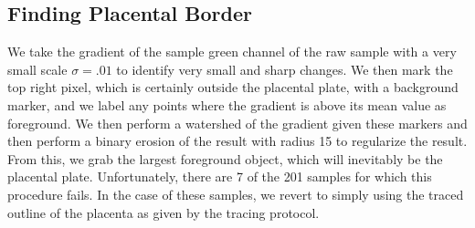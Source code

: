 %    
    
    \subsection{Finding Placental Border}
		
		We take the gradient of the sample green channel of the raw sample with a very small scale $\sigma=.01$ to identify very small and sharp changes. We then mark the top right pixel, which is certainly outside the placental plate, with a background marker, and we label any points where the gradient is above its mean value as foreground. We then perform a watershed of the gradient given these markers and then perform a binary erosion of the result with radius 15 to regularize the result. From this, we grab the largest foreground object, which will inevitably be the placental
		plate. Unfortunately, there are 7 of the 201 samples for which this procedure fails. In the case of these samples, we revert to simply using the traced outline of the placenta as given by the tracing protocol.
		
